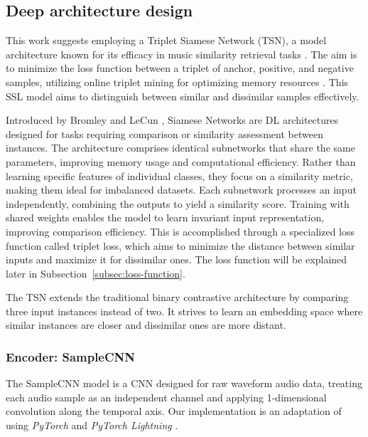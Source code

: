 \subsection{Deep architecture design}

This work suggests employing a Triplet Siamese Network (TSN), a model architecture known for its efficacy in music similarity retrieval tasks \cite{contentmusicsimtriplet2020}. The aim is to minimize the loss function between a triplet of anchor, positive, and negative samples, utilizing online triplet mining for optimizing memory resources \cite{Sikaroudi2020OfflinePatches}. This SSL model aims to distinguish between similar and dissimilar samples effectively.

Introduced by Bromley and LeCun \cite{Bromley1993SignatureNetwork}, Siamese Networks are DL architectures designed for tasks requiring comparison or similarity assessment between instances. The architecture comprises identical subnetworks that share the same parameters, improving memory usage and computational efficiency. Rather than learning specific features of individual classes, they focus on a similarity metric, making them ideal for imbalanced datasets. Each subnetwork processes an input independently, combining the outputs to yield a similarity score. Training with shared weights enables the model to learn invariant input representation, improving comparison efficiency. This is accomplished through a specialized loss function called triplet loss, which aims to minimize the distance between similar inputs and maximize it for dissimilar ones. The loss function will be explained later in Subsection~\ref{subsec:loss-function}.

The TSN extends the traditional binary contrastive architecture by comparing three input instances instead of two. It strives to learn an embedding space where similar instances are closer and dissimilar ones are more distant.

\subsubsection{Encoder: SampleCNN}

The SampleCNN model \cite{Lee2018SampleCNN:Classification} is a CNN designed for raw waveform audio data, treating each audio sample as an independent channel and applying 1-dimensional convolution along the temporal axis. Our implementation is an adaptation of \cite{CLMR2021} using \textit{PyTorch} \cite{Paszke2019PyTorch:Library} and \textit{PyTorch Lightning} \cite{PyTorchDocumentation}.

